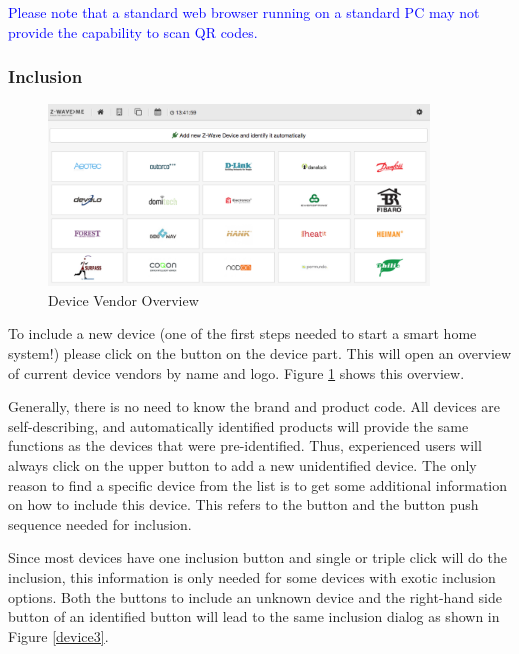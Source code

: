 \textcolor{blue}{Please note that a standard
web browser running on a standard PC may not provide the capability to scan QR codes. } 


\subsubsection{Inclusion}
\label{inclusion}

\begin{figure}
\begin{center}
\includegraphics[width=0.9\textwidth]{pngs/cap4/device1.png}
\caption{\zwave Device Vendor Overview}
\label{device1}
\end{center}
\end{figure}

To include a new \zwave device (one of the first steps needed to start a smart home 
system!) please click on the \keystroke{+} button on the \zwave device part. This will open an 
overview of current \zwave device vendors by name and logo. Figure \ref{device1} 
shows this overview.

Generally, there is no need to know the \zwave brand and product code. All \zwave devices 
are self-describing, and automatically identified products will provide the same functions 
as the devices that were pre-identified. Thus, experienced users will always click on 
the upper button to add a new unidentified \zwave device. The only reason to find a 
specific device from the list is to get some additional information on how to include this 
device. This refers to the button and the button push sequence needed for inclusion.

Since most \zwave devices have one \zwave inclusion button and single or triple click 
will do the inclusion, this information is only needed for some devices with exotic 
inclusion options. Both the buttons to include an unknown device and the right-hand 
side button of an identified button will lead to the same inclusion dialog as 
shown in Figure \ref{device3}.

